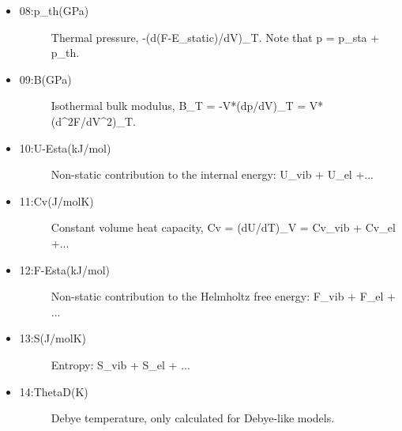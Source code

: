 \documentclass[a4paper]{article}
\begin{document}
\begin{itemize}
\begin{description}
\end{description}

\item %
\begin{description}
\item[{08:p\_th(GPa)}] \leavevmode 
Thermal pressure, -(d(F-E\_static)/dV)\_T. Note that p = p\_sta + p\_th.

\end{description}

\item %
\begin{description}
\item[{09:B(GPa)}] \leavevmode 
Isothermal bulk modulus, B\_T = -V*(dp/dV)\_T = V*(d\textasciicircum{}2F/dV\textasciicircum{}2)\_T.

\end{description}

\item %
\begin{description}
\item[{10:U-Esta(kJ/mol)}] \leavevmode 
Non-static contribution to the internal energy: U\_vib + U\_el +...

\end{description}

\item %
\begin{description}
\item[{11:Cv(J/molK)}] \leavevmode 
Constant volume heat capacity, Cv = (dU/dT)\_V = Cv\_vib + Cv\_el +...

\end{description}

\item %
\begin{description}
\item[{12:F-Esta(kJ/mol)}] \leavevmode 
Non-static contribution to the Helmholtz free energy: F\_vib +
F\_el + ...

\end{description}

\item %
\begin{description}
\item[{13:S(J/molK)}] \leavevmode 
Entropy: S\_vib + S\_el + ...

\end{description}

\item %
\begin{description}
\item[{14:ThetaD(K)}] \leavevmode 
Debye temperature, only calculated for Debye-like models.


\end{description}
\end{itemize}
\end{document}
